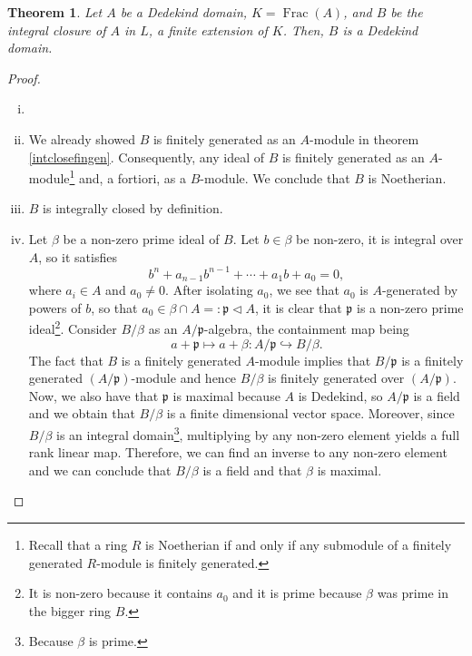 \documentclass{tufte-handout} %
\newtheorem{thm}{Theorem}
\theoremstyle{definition}
\theoremstyle{remark}
\newcommand{\lp}{{\mathfrak{p}}}
\DeclareMathOperator{\ff}{Frac}
\begin{document}
\begin{thm}
	Let $A$ be a Dedekind domain, $K = \ff(A)$, and $B$ be the integral closure of $A$ in $L$, a finite extension of $K$. Then, $B$ is a Dedekind domain.
\end{thm}
\begin{proof}
	\begin{enumerate}[(i)]
		\item[]
		\item We already showed $B$ is finitely generated as an $A$-module in theorem \ref{intclosefingen}. Consequently, any ideal of $B$ is finitely generated as an $A$-module\footnote{Recall that a ring $R$ is Noetherian if and only if any submodule of a finitely generated $R$-module is finitely generated.} and, a fortiori, as a $B$-module. We conclude that $B$ is Noetherian.
		\item $B$ is integrally closed by definition.
		\item Let $\beta$ be a non-zero prime ideal of $B$. Let $b \in \beta$ be non-zero, it is integral over $A$, so it satisfies 
		\[b^n + a_{n-1}b^{n-1} + \cdots + a_1b+ a_0 = 0,\]
		where $a_i \in A$ and $a_0 \neq 0$. After isolating $a_0$, we see that $a_0$ is $A$-generated by powers of $b$, so that $a_0 \in \beta \cap A =: \lp \lhd A$, it is clear that $\lp$ is a non-zero prime ideal\footnote{It is non-zero because it contains $a_0$ and it is prime because $\beta$ was prime in the bigger ring $B$.}. Consider $B/\beta$ as an $A/\lp$-algebra, the containment map being 
		\[a + \lp \mapsto a + \beta : A/\lp \hookrightarrow B/\beta.\]
		The fact that $B$ is a finitely generated $A$-module implies that $B/\lp$ is a finitely generated $(A/\lp)$-module and hence $B/\beta$ is finitely generated over $(A/\lp)$. Now, we also have that $\lp$ is maximal because $A$ is Dedekind, so $A/\lp$ is a field and we obtain that $B/\beta$ is a finite dimensional vector space. Moreover, since $B/\beta$ is an integral domain\footnote{Because $\beta$ is prime.}, multiplying by any non-zero element yields a full rank linear map. Therefore, we can find an inverse to any non-zero element and we can conclude that $B/\beta$ is a field and that $\beta$ is maximal.
	\end{enumerate}
\end{proof}
\end{document}
